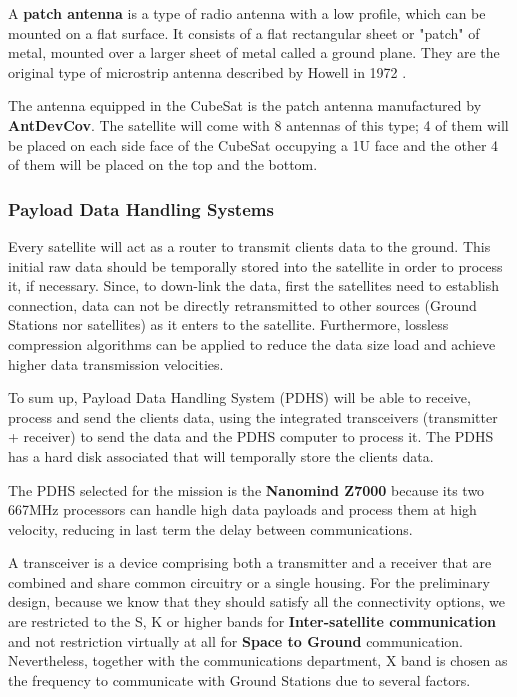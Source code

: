 A \textbf{patch antenna} is a type of radio antenna with a low profile, which can be mounted on a flat surface. It consists of a flat rectangular sheet or "patch" of metal, mounted over a larger sheet of metal called a ground plane. They are the original type of microstrip antenna described by Howell in 1972 \cite{patch}.

The antenna equipped in the CubeSat is the patch antenna manufactured by \textbf{AntDevCov}. The satellite will come with 8 antennas of this type; 4 of them will be placed on each side face of the CubeSat occupying a 1U face and the other 4 of them will be placed on the top and the bottom.

\subsubsection{Payload Data Handling Systems}
Every satellite will act as a router to transmit clients data to the ground. This initial raw data should be temporally stored into the satellite in order to process it, if necessary. Since, to down-link the data, first the satellites need to establish connection, data can not be directly retransmitted to other sources (Ground Stations nor satellites) as it enters to the satellite. Furthermore, lossless compression algorithms can be applied to reduce the data size load and achieve higher data transmission velocities.

To sum up, Payload Data Handling System (PDHS) will be able to receive, process and send the clients data, using the integrated transceivers (transmitter + receiver) to send the data and the PDHS computer to process it. The PDHS has a hard disk associated that will temporally store the clients data.

The PDHS selected for the mission is the \textbf{Nanomind Z7000} because its two 667MHz processors can handle high data payloads and process them at high velocity, reducing in last term the delay between communications. \cite[Chapter 1, Section 5]{annex4}

A transceiver is a device comprising both a transmitter and a receiver that are combined and share common circuitry or a single housing. For the preliminary design, because we know that they should satisfy all the connectivity options, we are restricted to the S, K or higher bands for \textbf{Inter-satellite communication} and not restriction virtually at all for \textbf{Space to Ground} communication. Nevertheless, together with the communications department, X band is chosen as the frequency to communicate with Ground Stations due to several factors.

